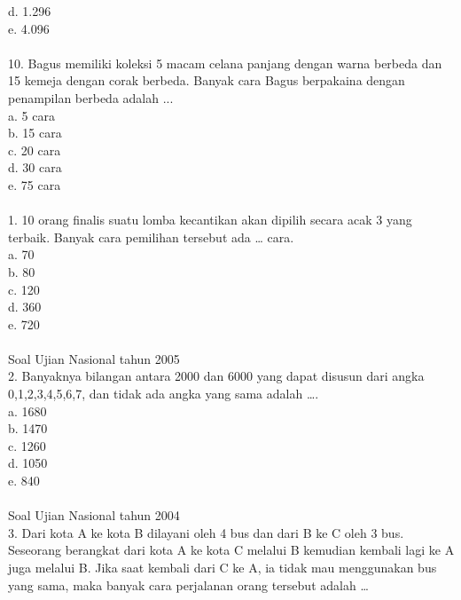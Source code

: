 \documentclass[11pt,fleqn]{book} %
\begin{document}
d.	1.296\\

e.	4.096\\
\\

10. Bagus memiliki koleksi 5 macam celana panjang dengan warna berbeda dan 15 kemeja dengan corak berbeda. Banyak cara Bagus berpakaina dengan penampilan berbeda adalah ...\\ 

a.	5 cara\\

b.	15 cara\\

c.	20 cara\\

d.	30 cara\\

e.	75 cara\\
\\

1. 10 orang finalis suatu lomba kecantikan akan dipilih secara acak 3 yang terbaik. Banyak cara pemilihan tersebut ada … cara.\\

a.	70\\

b.	80\\

c.	120\\

d.	360\\

e.	720\\
\\

Soal Ujian Nasional tahun 2005\\
2. Banyaknya bilangan antara 2000 dan 6000 yang dapat disusun dari angka 0,1,2,3,4,5,6,7, dan tidak ada angka yang sama adalah ….\\

a. 1680\\

b. 1470\\

c. 1260\\

d. 1050\\

e. 840\\
\\

Soal Ujian Nasional tahun 2004\\
3. Dari kota A ke kota B dilayani oleh 4 bus dan dari B ke C oleh 3 bus. Seseorang berangkat dari kota A ke kota C melalui B kemudian kembali lagi ke A juga melalui B. Jika saat kembali dari C ke A, ia tidak mau menggunakan bus yang sama, maka banyak cara perjalanan orang tersebut adalah …\\
\end{document}
